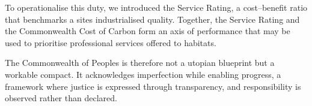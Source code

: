 \documentclass[10pt, oneside]{article}   	%
\begin{document}
To operationalise this duty, we introduced the Service Rating, a cost–benefit ratio that benchmarks a sites industrialised quality.
Together, the Service Rating and the Commonwealth Cost of Carbon form an axis of performance that may be used to prioritise professional services offered to habitats.

The Commonwealth of Peoples is therefore not a utopian blueprint but a workable compact.
It acknowledges imperfection while enabling progress, a framework where justice is expressed through transparency, and responsibility is observed rather than declared.\\

\pagebreak

 

\end{document}
